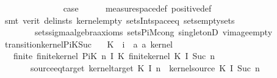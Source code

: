 \begin{isabellebody}
\ \ \ \ \ \ \isacommand{{\isachardot}{\kern0pt}}\isamarkupfalse%
\isanewline
\ \ \isamarkupfalse%
\isanewline
\ \ \isamarkupfalse%
\ \isamarkupfalse%
\ {\isacharquery}{\kern0pt}case\isanewline
\ \ \ \ \isamarkupfalse%
\ measure{\isacharunderscore}{\kern0pt}space{\isacharunderscore}{\kern0pt}def\ positive{\isacharunderscore}{\kern0pt}def\isanewline
\ \ \ \ \isamarkupfalse%
\ {\isacharparenleft}{\kern0pt}smt\ {\isacharparenleft}{\kern0pt}verit{\isacharcomma}{\kern0pt}\ del{\isacharunderscore}{\kern0pt}insts{\isacharparenright}{\kern0pt}\ kernel{\isacharunderscore}{\kern0pt}empty\ sets{\isachardot}{\kern0pt}Int{\isacharunderscore}{\kern0pt}space{\isacharunderscore}{\kern0pt}eq{}\ sets{\isachardot}{\kern0pt}empty{\isacharunderscore}{\kern0pt}sets\ \isanewline
\ \ \ \ \ \ \ \ sets{\isachardot}{\kern0pt}sigma{\isacharunderscore}{\kern0pt}algebra{\isacharunderscore}{\kern0pt}axioms\ sets{\isacharunderscore}{\kern0pt}PiM{\isacharunderscore}{\kern0pt}cong\ singletonD\ vimage{\isacharunderscore}{\kern0pt}empty{\isacharparenright}{\kern0pt}\isanewline
{}\isamarkupfalse%
%
\endisatagproof
{\isafoldproof}%
%
\isadelimproof
\isanewline
%
\endisadelimproof
\isanewline
{}\isamarkupfalse%
\ transition{\isacharunderscore}{\kern0pt}kernel{\isacharunderscore}{\kern0pt}PiK{\isacharunderscore}{\kern0pt}Suc{\isacharcolon}{\kern0pt}\isanewline
\ \ \ K\ {\isacharcolon}{\kern0pt}{\isacharcolon}{\kern0pt}\ {\isachardoublequoteopen}{\isacharprime}{\kern0pt}i\ {\isasymRightarrow}\ {\isacharparenleft}{\kern0pt}{\isacharprime}{\kern0pt}a{\isacharcomma}{\kern0pt}\ {\isacharprime}{\kern0pt}a{\isacharparenright}{\kern0pt}\ kernel{\isachardoublequoteclose}\isanewline
\ \ \ finite{\isacharcolon}{\kern0pt}\ {\isachardoublequoteopen}finite{\isacharunderscore}{\kern0pt}kernel\ {\isacharparenleft}{\kern0pt}PiK\ n\ I\ K{\isacharparenright}{\kern0pt}{\isachardoublequoteclose}\ {\isachardoublequoteopen}finite{\isacharunderscore}{\kern0pt}kernel\ {\isacharparenleft}{\kern0pt}K\ {\isacharparenleft}{\kern0pt}I\ {\isacharparenleft}{\kern0pt}Suc\ n{\isacharparenright}{\kern0pt}{\isacharparenright}{\kern0pt}{\isacharparenright}{\kern0pt}{\isachardoublequoteclose}\isanewline
\ \ \ \ \ \ \ source{\isacharunderscore}{\kern0pt}eq{\isacharunderscore}{\kern0pt}target{\isacharcolon}{\kern0pt}\ {\isachardoublequoteopen}kernel{\isacharunderscore}{\kern0pt}target\ {\isacharparenleft}{\kern0pt}K\ {\isacharparenleft}{\kern0pt}I\ n{\isacharparenright}{\kern0pt}{\isacharparenright}{\kern0pt}\ {\isacharequal}{\kern0pt}\ kernel{\isacharunderscore}{\kern0pt}source\ {\isacharparenleft}{\kern0pt}K\ {\isacharparenleft}{\kern0pt}I\ {\isacharparenleft}{\kern0pt}Suc\ n{\isacharparenright}{\kern0pt}{\isacharparenright}{\kern0pt}{\isacharparenright}{\kern0pt}{\isachardoublequoteclose}\isanewline

\end{isabellebody}
